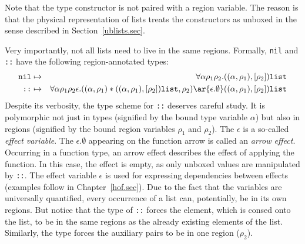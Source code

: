 \documentclass[12pt]{book}
\begin{document}
Note that the  type constructor is not paired with a region variable.
The reason is that the physical representation of lists treats the constructors
as unboxed in the sense described in Section~\ref{ublists.sec}.

Very importantly, not all lists need to live in the same regions.
Formally, {\tt nil} and {\tt ::} have the following region-annotated types:
\begin{eqnarray*}
\boxml{nil} & \mapsto & \forall\alpha\rho_1\rho_2.((\alpha,\rho_1),[\rho_2])\boxml{list}\\
\boxml{::}  & \mapsto & \forall\alpha\rho_1\rho_2\epsilon.((\alpha,\rho_1)\ast((\alpha,\rho_1),[\rho_2])\boxml{list},\rho_2)
\ar{\epsilon.\emptyset} ((\alpha,\rho_1),[\rho_2])\boxml{list}
\end{eqnarray*}
Despite its verbosity, 
the type scheme for {\tt ::} deserves careful study. It is polymorphic not just in types
(signified by the bound type variable $\alpha$) but also in  regions (signified by the 
bound region variables $\rho_1$ and $\rho_2$). The $\epsilon$ is a so-called 
%
{\em effect variable}. 
The $\epsilon.\emptyset$ appearing on the function arrow is called an 
%
{\em arrow effect}.
Occurring in a function type, an arrow effect describes the effect of applying the function.
In this case, the effect is empty, as only unboxed values are manipulated by {\tt ::}. The effect variable $\epsilon$ 
is used for expressing dependencies between effects (examples follow in Chapter~\ref{hof.sec}). Due to the fact that 
the variables are universally quantified, every occurrence of a list can, potentially, be in its own regions. But notice 
that the type of {\tt ::} forces the element, which is consed onto the list, to be in the same regions 
as the already existing elements of the list. Similarly, the type forces the auxiliary pairs to be in
one region ($\rho_2$).
\end{document}
